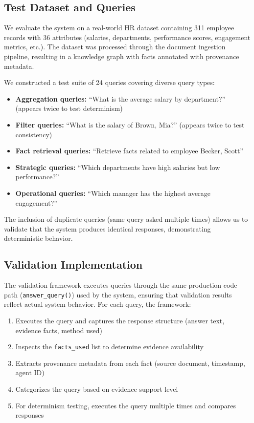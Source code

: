 \subsection{Test Dataset and Queries}

We evaluate the system on a real-world HR dataset containing 311 employee records with 36 attributes (salaries, departments, performance scores, engagement metrics, etc.). The dataset was processed through the document ingestion pipeline, resulting in a knowledge graph with facts annotated with provenance metadata.

We constructed a test suite of 24 queries covering diverse query types:
\begin{itemize}
    \item \textbf{Aggregation queries:} ``What is the average salary by department?'' (appears twice to test determinism)
    \item \textbf{Filter queries:} ``What is the salary of Brown, Mia?'' (appears twice to test consistency)
    \item \textbf{Fact retrieval queries:} ``Retrieve facts related to employee Becker, Scott''
    \item \textbf{Strategic queries:} ``Which departments have high salaries but low performance?''
    \item \textbf{Operational queries:} ``Which manager has the highest average engagement?''
\end{itemize}

The inclusion of duplicate queries (same query asked multiple times) allows us to validate that the system produces identical responses, demonstrating deterministic behavior.

\subsection{Validation Implementation}

The validation framework executes queries through the same production code path (\texttt{answer\_query()}) used by the system, ensuring that validation results reflect actual system behavior. For each query, the framework:

\begin{enumerate}
    \item Executes the query and captures the response structure (answer text, evidence facts, method used)
    \item Inspects the \texttt{facts\_used} list to determine evidence availability
    \item Extracts provenance metadata from each fact (source document, timestamp, agent ID)
    \item Categorizes the query based on evidence support level
    \item For determinism testing, executes the query multiple times and compares responses
\end{enumerate}

